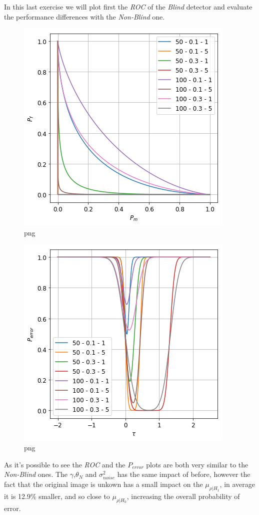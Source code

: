 In this last exercise we will plot first the \emph{ROC} of the
\emph{Blind} detector and evaluate the performance differences with the
\emph{Non-Blind} one.

\begin{figure}
\centering
\includegraphics{output_17_0.png}
\caption{png}
\end{figure}

\begin{figure}
\centering
\includegraphics{output_17_1.png}
\caption{png}
\end{figure}

As it's possible to see the \emph{ROC} and the \(P_{error}\) plots are
both very similar to the \emph{Non-Blind} ones. The
\(\gamma\),\(\theta_N\) and \(\sigma^2_{noise}\) has the same impact of
before, however the fact that the original image is unkown has a small
impact on the \(\mu_{\rho|H_1}\), in average it is 12.9\% smaller, and
so close to \(\mu_{\rho|H_0}\), increasing the overall probability of
error.

